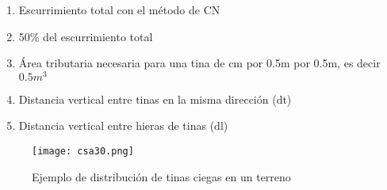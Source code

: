     \begin{enumerate}
        \item Escurrimiento total con el método de CN
        \item 50\% del escurrimiento total
        \item Área tributaria necesaria para una tina de cm por 0.5m por 0.5m, es decir $0.5m^3$
        \item Distancia vertical entre tinas en la misma dirección (dt)
        \item Distancia vertical entre hieras de tinas (dl)
    \end{enumerate}
    \begin{figure}[h!]
    \centering
      \texttt{[image: csa30.png]}
      \caption{Ejemplo de distribución de tinas ciegas en un terreno}
      \label{csa30}
    \end{figure}
